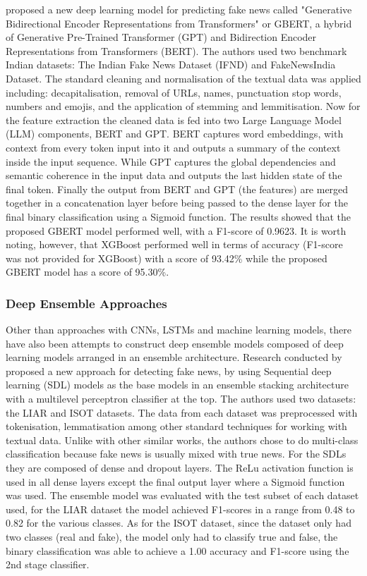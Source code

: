 \documentclass[stu,12pt,floatsintext,donotrepeattitle]{apa7}
\begin{document}
\textcite{gbert} proposed a new deep learning model for predicting fake news called "Generative Bidirectional Encoder Representations from Transformers" or GBERT, a hybrid of Generative Pre-Trained Transformer (GPT) and Bidirection Encoder Representations from Transformers (BERT). The authors used two benchmark Indian datasets: The Indian Fake News Dataset (IFND) and FakeNewsIndia Dataset. The standard cleaning and normalisation of the textual data was applied including: decapitalisation, removal of URLs, names, punctuation stop words, numbers and emojis, and the application of stemming and lemmitisation. Now for the feature extraction the cleaned data is fed into two Large Language Model (LLM) components, BERT and GPT. BERT captures word embeddings, with context from every token input into it and outputs a summary of the context inside the input sequence. While GPT captures the global dependencies and semantic coherence in the input data and outputs the last hidden state of the final token. Finally the output from BERT and GPT (the features) are merged together in a concatenation layer before being passed to the dense layer for the final binary classification using a Sigmoid function. The results showed that the proposed GBERT model performed well, with a F1-score of 0.9623. It is worth noting, however, that XGBoost performed well in terms of accuracy (F1-score was not provided for XGBoost) with a score of 93.42\% while the proposed GBERT model has a score of 95.30\%.

\subsubsection{Deep Ensemble Approaches}
Other than approaches with CNNs, LSTMs and machine learning models, there have also been attempts to construct deep ensemble models composed of deep learning models arranged in an ensemble architecture. Research conducted by \parencite{deep-ensemble} proposed a new approach for detecting fake news, by using Sequential deep learning (SDL) models as the base models in an ensemble stacking architecture with a multilevel perceptron classifier at the top. The authors used two datasets: the LIAR and ISOT datasets. The data from each dataset was preprocessed with tokenisation, lemmatisation among other standard techniques for working with textual data. Unlike with other similar works, the authors chose to do multi-class classification because fake news is usually mixed with true news. For the SDLs they are composed of dense and dropout layers. The ReLu activation function is used in all dense layers except the final output layer where a Sigmoid function was used. The ensemble model was evaluated with the test subset of each dataset used, for the LIAR dataset the model achieved F1-scores in a range from 0.48 to 0.82 for the various classes. As for the ISOT dataset, since the dataset only had two classes (real and fake), the model only had to classify true and false, the binary classification was able to achieve a 1.00 accuracy and F1-score using the 2nd stage classifier. 
\end{document}
